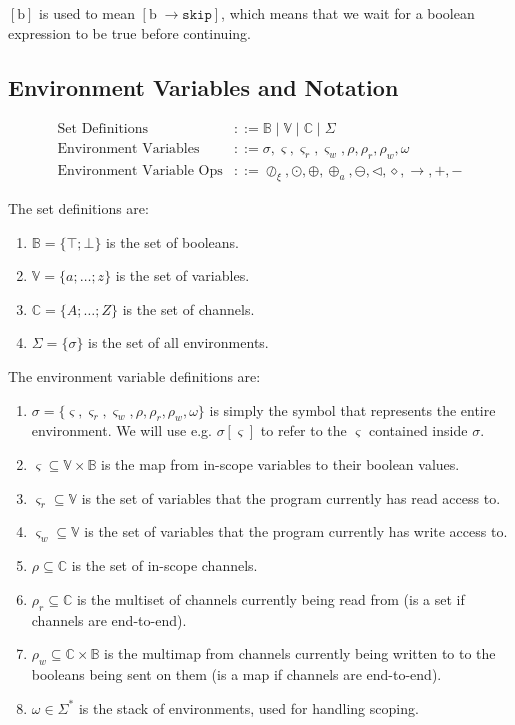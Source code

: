 \documentclass[times,10pt]{article}
\begin{document}
$[\textrm{b}]$ is used to mean $[\textrm{b} \; \rightarrow \mathtt{skip}]$, which means that we wait for a boolean expression to be true before continuing.

\subsection{Environment Variables and Notation}

\begin{align*}
    \text{Set Definitions} & ::= \mathbb{B} \; | \; \mathbb{V} \; | \; \mathbb{C} \; | \; \Sigma \\
    \text{Environment Variables} & ::= \sigma, \varsigma, \varsigma_r, \varsigma_w, \rho, \rho_r, \rho_w, \omega \\
    \text{Environment Variable Ops} & ::= \oslash_\xi, \odot, \oplus, \oplus_a, \ominus, \triangleleft, \diamond, \rightarrow, +, -
\end{align*}

The set definitions are:
\begin{enumerate}
    \item $\mathbb{B} = \{\top; \bot\}$ is the set of booleans.
    \item $\mathbb{V} = \{a; \ldots; z\}$ is the set of variables.
    \item $\mathbb{C} = \{A; \ldots; Z\}$ is the set of channels.
    \item $\Sigma = \{\sigma\}$ is the set of all environments.
\end{enumerate}

The environment variable definitions are:
\begin{enumerate}
    \item $\sigma = \{\varsigma, \varsigma_r, \varsigma_w, \rho, \rho_r, \rho_w, \omega\}$ is simply the symbol that represents the entire environment. We will use e.g. $\sigma[\varsigma]$ to refer to the $\varsigma$ contained inside $\sigma$.
    \item $\varsigma \subseteq \mathbb{V} \times \mathbb{B}$ is the map from in-scope variables to their boolean values.
    \item $\varsigma_r \subseteq \mathbb{V}$ is the set of variables that the program currently has read access to.
    \item $\varsigma_w \subseteq \mathbb{V}$ is the set of variables that the program currently has write access to.
    \item $\rho \subseteq \mathbb{C}$ is the set of in-scope channels.
    \item $\rho_r \subseteq \mathbb{C}$ is the multiset of channels currently being read from (is a set if channels are end-to-end).
    \item $\rho_w \subseteq \mathbb{C} \times \mathbb{B}$ is the multimap from channels currently being written to to the booleans being sent on them (is a map if channels are end-to-end).
    \item $\omega \in \Sigma^*$ is the stack of environments, used for handling scoping.
\end{enumerate}
\end{document}
